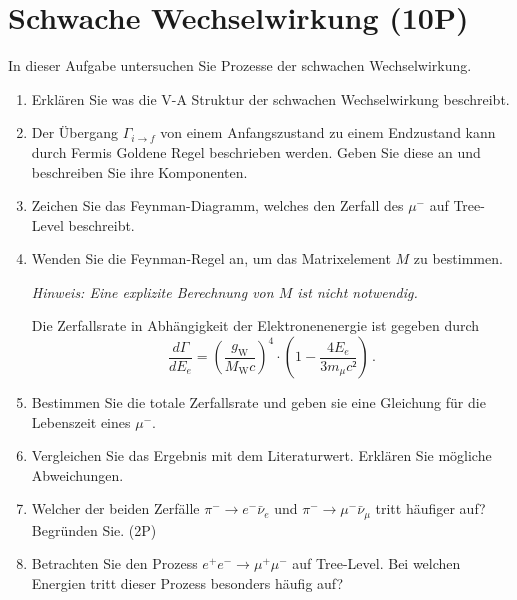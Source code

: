 \section{Schwache Wechselwirkung (10P)}

In dieser Aufgabe untersuchen Sie Prozesse der schwachen Wechselwirkung.

\begin{enumerate}
    \item Erklären Sie was die V-A Struktur der schwachen Wechselwirkung beschreibt.

    \item Der Übergang $\Gamma_{i \to f}$ von einem Anfangszustand zu einem Endzustand kann durch Fermis Goldene Regel beschrieben werden.
    Geben Sie diese an und beschreiben Sie ihre Komponenten.
    \item Zeichen Sie das Feynman-Diagramm, welches den Zerfall des $\mu^-$ auf Tree-Level beschreibt.

    \item Wenden Sie die Feynman-Regel an, um das Matrixelement $M$ zu bestimmen.
    
    \textit{Hinweis: Eine explizite Berechnung von $M$ ist nicht notwendig.} 

    Die Zerfallsrate in Abhängigkeit der Elektronenenergie ist gegeben durch 
    \begin{equation}
        \dfrac{d \Gamma}{d E_e} = \left(\dfrac{g_\text{W}}{M_\text{W}c}\right)^4 \cdot \left(1 - \dfrac{4 E_e}{3 m_\mu c²}\right) \,.
    \end{equation}
    \item Bestimmen Sie die totale Zerfallsrate und geben sie eine Gleichung für die Lebenszeit eines $\mu^-$.
    \item Vergleichen Sie das Ergebnis mit dem Literaturwert. Erklären Sie mögliche Abweichungen.

    \item Welcher der beiden Zerfälle $\pi^- \to e^- \bar{\nu}_{e}$ und $\pi^- \to \mu^- \bar{\nu}_{\mu}$ tritt häufiger auf? Begründen Sie. (2P)

    \item Betrachten Sie den Prozess $e^+ e^- \to \mu^+ \mu^-$ auf Tree-Level. Bei welchen Energien tritt dieser Prozess besonders häufig auf? 

\end{enumerate}